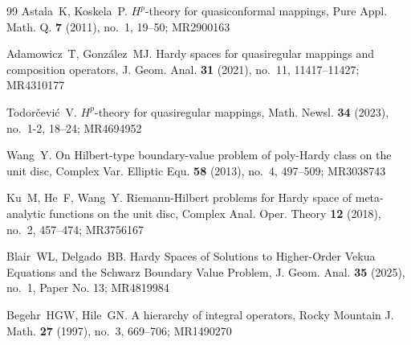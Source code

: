 \documentclass[suppldata]{interact}
\theoremstyle{plain}%
\theoremstyle{definition}
\theoremstyle{remark}
\begin{document}
\begin{thebibliography}{99}
Astala~K, Koskela~P. $H^p$-theory for quasiconformal mappings, Pure Appl. Math. Q. {\bf 7} (2011), no.~1, 19--50; MR2900163

Adamowicz~T, Gonz\'alez~MJ. Hardy spaces for quasiregular mappings and composition operators, J. Geom. Anal. {\bf 31} (2021), no.~11, 11417--11427; MR4310177

Todor\v cevi\'c~V. $H^p$-theory for quasiregular mappings, Math. Newsl. {\bf 34} (2023), no.~1-2, 18--24; MR4694952

Wang~Y. On Hilbert-type boundary-value problem of poly-Hardy class on the unit disc, Complex Var. Elliptic Equ. {\bf 58} (2013), no.~4, 497--509; MR3038743

Ku~M, He~F, Wang~Y. Riemann-Hilbert problems for Hardy space of meta-analytic functions on the unit disc, Complex Anal. Oper. Theory {\bf 12} (2018), no.~2, 457--474; MR3756167

Blair~WL, Delgado~BB. Hardy Spaces of Solutions to Higher-Order Vekua Equations and the Schwarz Boundary Value Problem, J. Geom. Anal. {\bf 35} (2025), no.~1, Paper No. 13; MR4819984

Begehr~HGW, Hile~GN. A hierarchy of integral operators, Rocky Mountain J. Math. {\bf 27} (1997), no.~3, 669--706; MR1490270


\end{thebibliography}
\end{document}
